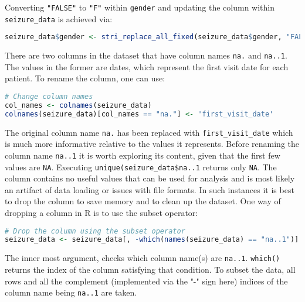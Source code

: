 Converting \verb|"FALSE"| to \verb|"F"| within \verb|gender| and updating the column within \verb|seizure_data| is achieved via:
\begin{lstlisting}[language=R]
seizure_data$gender <- stri_replace_all_fixed(seizure_data$gender, "FALSE", "F")
\end{lstlisting}

There are two columns in the dataset that have column names \verb|na.| and \verb|na..1|. The values in the former are dates, which represent the first visit date for each patient. To rename the column, one can use:
\begin{lstlisting}[language=R]
# Change column names
col_names <- colnames(seizure_data)
colnames(seizure_data)[col_names == "na."] <- 'first_visit_date'
\end{lstlisting}
The original column name \verb|na.| has been replaced with \verb|first_visit_date| which is much more informative relative to the values it represents.
Before renaming the column name \verb|na..1| it is worth exploring its content, given that the first few values are \verb|NA|. Executing \verb|unique(seizure_data$na..1| returns only \verb|NA|. The column contains no useful values that can be used for analysis and is most likely an artifact of data loading or issues with file formats. In such instances it is best to drop the column to save memory and to clean up the dataset. One way of dropping a column in R is to use the subset operator:
\begin{lstlisting}[language=R]
# Drop the column using the subset operator
seizure_data <- seizure_data[, -which(names(seizure_data) == "na..1")]
\end{lstlisting}
The inner most argument, checks which column name(s) are \verb|na..1|. \verb|which()| returns the index of the column satisfying that condition. To subset the data, all rows and all the complement (implemented via the "-" sign here) indices of the column name being \verb|na..1| are taken.


